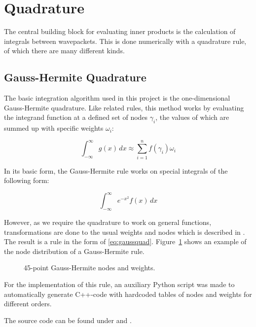 \section{Quadrature}

The central building block for evaluating inner products is the calculation of
integrals between wavepackets.
This is done numerically with a quadrature rule, of which there are many
different kinds.


\subsection{Gauss-Hermite Quadrature}
\label{subsec:ghquad}

The basic integration algorithm used in this project is the one-dimensional
Gauss-Hermite quadrature.
Like related rules, this method works by evaluating the integrand function at a
defined set of nodes $\gamma_i$, the values of which are summed up with specific
weights $\omega_i$:

\begin{equation}
  \label{eq:gaussquad}
  \int_{-\infty}^{\infty} g(x) \, dx \approx \sum_{i=1}^{n} f(\gamma_i) \omega_i
\end{equation}

In its basic form, the Gauss-Hermite rule works on special integrals of the
following form:

\begin{equation}
  \int_{-\infty}^{\infty} e^{-x^2} f(x) \, dx
\end{equation}

However, as we require the quadrature to work on general functions,
transformations are done to the usual weights and nodes which is described in
\cite{B_master_thesis}.
The result is a rule in the form of \eqref{eq:gaussquad}.
Figure~\ref{fig:ghexample} shows an example of the node distribution of a
Gauss-Hermite rule.

\begin{figure}
  \center
  
  \caption{45-point Gauss-Hermite nodes and weights.}
  \label{fig:ghexample}
\end{figure}

For the implementation of this rule, an auxiliary Python script was made to
automatically generate C++-code with hardcoded tables of nodes and weights for
different orders.

The source code can be found under  and
.



